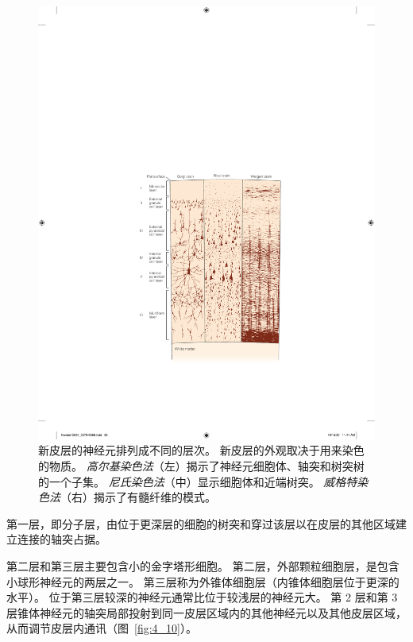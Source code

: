 \begin{figure}[htbp]
	\centering
	\includegraphics[width=0.8\linewidth]{chap04/fig_4_9}
	\caption{新皮层的神经元排列成不同的层次。 
		新皮层的外观取决于用来染色的物质。 
		\textit{高尔基染色法}（左）揭示了神经元细胞体、轴突和树突树的一个子集。 
		\textit{尼氏染色法}（中）显示细胞体和近端树突。
		\textit{威格特染色法}（右）揭示了有髓纤维的模式\cite{heimer2012human}。}
	\label{fig:4_9}
\end{figure}


第一层，即分子层，由位于更深层的细胞的树突和穿过该层以在皮层的其他区域建立连接的轴突占据。


第二层和第三层主要包含小的金字塔形细胞。 
第二层，外部颗粒细胞层，是包含小球形神经元的两层之一。 
第三层称为外锥体细胞层（内锥体细胞层位于更深的水平）。 
位于第三层较深的神经元通常比位于较浅层的神经元大。 
第 2 层和第 3 层锥体神经元的轴突局部投射到同一皮层区域内的其他神经元以及其他皮层区域，从而调节皮层内通讯（图~\ref{fig:4_10}）。

